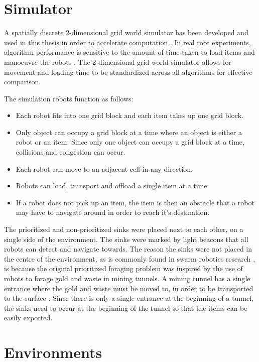 \section{Simulator}
\label{simulator}
A spatially discrete 2-dimensional grid world simulator has been developed and used in this thesis in order to accelerate computation \cite{sugawara2002swarming}. In real root experiments, algorithm performance is sensitive to the amount of time taken to load items and manoeuvre the robots \cite{ostergaard2001emergent}. The 2-dimensional grid world simulator allows for movement and loading time to be standardized across all algorithms for effective comparison.

The simulation robots function as follows:
\begin{itemize}
	\item Each robot fits into one grid block and each item takes up one grid block. 
	\item Only object can occupy a grid block at a time where an object is either a robot or an item. Since only one object can occupy a grid block at a time, collisions and congestion can occur.
	\item Each robot can move to an adjacent cell in any direction.
	\item Robots can load, transport and offload a single item at a time.
	\item If a robot does not pick up an item, the item is then an obstacle that a robot may have to navigate around in order to reach it's destination.
\end{itemize}

The prioritized and non-prioritized sinks were placed next to each other, on a single side of the environment. The sinks were marked by light beacons that all robots can detect and navigate towards. The reason the sinks were not placed in the centre of the environment, as is commonly found in swarm robotics research \cite{labella2006division}, is because the original prioritized foraging problem was inspired by the use of robots to forage gold and waste in mining tunnels. A mining tunnel has a single entrance where the gold and waste must be moved to, in order to be transported to the surface \cite{brune2010extracting}. Since there is only a single entrance at the beginning of a tunnel, the sinks need to occur at the beginning of the tunnel so that the items can be easily exported.

\section{Environments}
\label{experimentenvironments}

